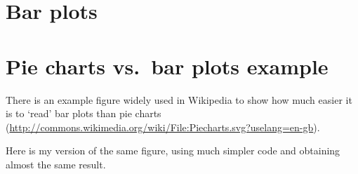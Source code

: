\documentclass[paper=a4,10pt,div=17,headsepline,BCOR=12mm,twoside,open=right]{scrbook}\usepackage{knitr}
\begin{document}
\section{Bar plots}

\section{Pie charts vs.\ bar plots example}

There is an example figure widely used in Wikipedia to show how much easier it is to `read' bar plots than pie charts (\url{http://commons.wikimedia.org/wiki/File:Piecharts.svg?uselang=en-gb}).

Here is my \ggplot version of the same figure, using much simpler code and obtaining almost the same result.

\begin{knitrout}\footnotesize
{}\color{fgcolor}\begin{kframe}
\begin{alltt}
 \hlkwb{<-}
  \hlstd{(} \hlstd{=} \hlstd{(}\hlstd{,} \hlstd{,} \hlstd{,} \hlstd{,} \hlstd{,}
                        \hlstd{,} \hlstd{,} \hlstd{,} \hlstd{,} \hlstd{,}
                        \hlstd{,} \hlstd{,} \hlstd{,} \hlstd{,} \hlstd{),}
             \hlstd{=} \hlstd{(}\hlstd{(}\hlstd{,} \hlstd{,} \hlstd{),} \hlstd{(}\hlstd{,}\hlstd{,}\hlstd{)),}
              \hlstd{=} \hlstd{(}\hlstd{(}\hlstd{,} \hlstd{,} \hlstd{,} \hlstd{,} \hlstd{),} \hlstd{)}
  \hlstd{)}

 \hlstd{(}   \hlopt{+}
  \hlstd{(} \hlstd{=} \hlstd{,} \hlstd{=}\hlstd{)} \hlopt{+}
  \hlopt{~} \hlopt{+}
  \hlstd{()}
 \hlstd{(}\hlstd{=}\hlstd{(}\hlstd{),}   \hlopt{+}
  \hlstd{(} \hlstd{=} \hlstd{,} \hlstd{=}\hlstd{)} \hlopt{+}
  \hlopt{~} \hlopt{+}
  \hlstd{()} \hlopt{+}
  \hlstd{(}\hlstd{=}\hlstd{)}
\end{alltt}
\end{kframe}


\end{knitrout}
\end{document}
